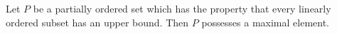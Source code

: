 Let $P$ be a partially ordered set which has the property that every linearly ordered subset has an upper bound. Then $P$ possesses a maximal element.

